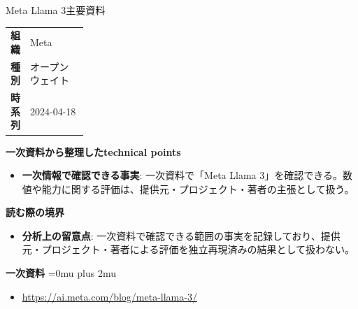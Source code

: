 \begin{technicalnote}{Meta Llama 3}{主要資料}
\begingroup
\begin{tabularx}{\linewidth}{@{}>{\bfseries}p{0.22\linewidth}X@{}}
組織 & Meta \\
種別 & オープンウェイト \\
時系列 & 2024-04-18 \\
\end{tabularx}
\smallskip
{\bfseries 一次資料から整理したtechnical points}
\begin{itemize}[leftmargin=1.5em,itemsep=0.35em]
\item \textbf{一次情報で確認できる事実}: 一次資料で「Meta Llama 3」を確認できる。数値や能力に関する評価は、提供元・プロジェクト・著者の主張として扱う。
\end{itemize}
\begin{minipage}{\linewidth}
{\bfseries 読む際の境界}
\begin{itemize}[leftmargin=1.5em,itemsep=0.35em]
\item \textbf{分析上の留意点}: 一次資料で確認できる範囲の事実を記録しており、提供元・プロジェクト・著者による評価を独立再現済みの結果として扱わない。
\end{itemize}
\begin{samepage}
{\bfseries 一次資料}
\begingroup\sloppy
\Urlmuskip=0mu plus 2mu\relax
\begin{itemize}[leftmargin=1.5em,itemsep=0.25em]
\item {\scriptsize\url{https://ai.meta.com/blog/meta-llama-3/}}
\end{itemize}
\endgroup
\end{samepage}
\end{minipage}
\endgroup
\end{technicalnote}
\medskip

